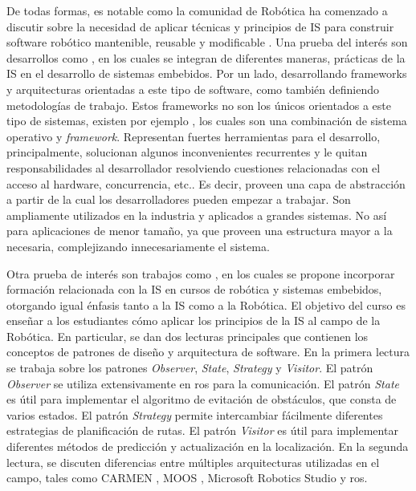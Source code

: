 De todas formas, es notable como la comunidad de Robótica ha comenzado a discutir sobre la necesidad de aplicar técnicas y principios de IS para construir software robótico mantenible, reusable y modificable \cite{Brugali2009, mejoras-2}. Una prueba del interés son desarrollos como \cite{FernandezMadrigal2003, model,model1,model2,model3}, en los cuales se integran de diferentes maneras, prácticas de la \gls{IS} en el desarrollo de sistemas embebidos. Por un lado, desarrollando \glspl{framework} y arquitecturas orientadas a este tipo de software, como también definiendo metodologías de trabajo. Estos \glspl{framework} no son los únicos orientados a este tipo de sistemas, existen por ejemplo \cite{framework-1, framework-ros}, los cuales son una combinación de sistema operativo y \textit{framework}. Representan fuertes herramientas para el desarrollo, principalmente, solucionan algunos inconvenientes recurrentes y le quitan responsabilidades al desarrollador resolviendo cuestiones relacionadas con el acceso al hardware, concurrencia, etc.. Es decir, proveen una capa de abstracción a partir de la cual los desarrolladores pueden empezar a trabajar. Son ampliamente utilizados en la industria y aplicados a grandes sistemas. No así para aplicaciones de menor tamaño, ya que proveen una estructura mayor a la necesaria, complejizando innecesariamente el sistema.

Otra prueba de interés son trabajos como \cite{Shin15fase}, en los cuales se propone incorporar formación relacionada con la \gls{IS} en cursos de robótica y sistemas embebidos, otorgando igual énfasis tanto a la \gls{IS} como a la Robótica. El objetivo del curso es enseñar a los estudiantes cómo aplicar los principios de la \gls{IS} al campo de la Robótica. En particular, se dan dos lecturas principales que contienen los conceptos de patrones de diseño y arquitectura de software. En la primera lectura se trabaja sobre los patrones \textit{Observer}, \textit{State}, \textit{Strategy} y \textit{Visitor}. El patrón \textit{Observer} se utiliza extensivamente en \gls{ros}\cite{framework-ros} para la comunicación. El patrón \textit{State} es útil para implementar el algoritmo de evitación de obstáculos, que consta de varios estados. El patrón \textit{Strategy} permite intercambiar fácilmente diferentes estrategias de planificación de rutas. El patrón \textit{Visitor} es útil para implementar diferentes métodos de predicción y actualización en la localización. En la segunda lectura, se discuten diferencias entre múltiples arquitecturas utilizadas en el campo, tales como CARMEN \cite{carmen}, MOOS \cite{moos}, Microsoft Robotics Studio \cite{microsoft} y \gls{ros}\cite{framework-ros}. 

